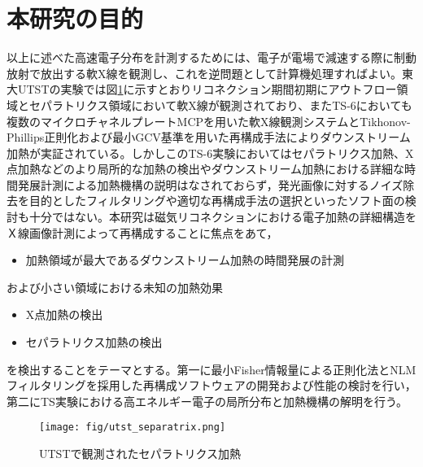 \section{本研究の目的}
以上に述べた高速電子分布を計測するためには、電子が電場で減速する際に制動放射で放出する軟X線を観測し、これを逆問題として計算機処理すればよい。東大UTSTの実験では図\ref{fig:utst}に示すとおりリコネクション期間初期にアウトフロー領域とセパラトリクス領域において軟X線が観測されており\cite{utst}、またTS-6においても複数のマイクロチャネルプレートMCPを用いた軟X線観測システムとTikhonov-Phillips正則化および最小GCV基準\cite{iwama}を用いた再構成手法によりダウンストリーム加熱が実証されている。しかしこのTS-6実験においてはセパラトリクス加熱、X点加熱などのより局所的な加熱の検出やダウンストリーム加熱における詳細な時間発展計測による加熱機構の説明はなされておらず，発光画像に対するノイズ除去を目的としたフィルタリングや適切な再構成手法の選択といったソフト面の検討も十分ではない。本研究は磁気リコネクションにおける電子加熱の詳細構造をＸ線画像計測によって再構成することに焦点をあて，
\begin{itemize}
	\item [(1)]加熱領域が最大であるダウンストリーム加熱の時間発展の計測
\end{itemize}
および小さい領域における未知の加熱効果
\begin{itemize}
	\item [(2)]X点加熱の検出
	\item [(3)]セパラトリクス加熱の検出
\end{itemize}
を検出することをテーマとする。第一に最小Fisher情報量による正則化法とNLMフィルタリングを採用した再構成ソフトウェアの開発および性能の検討を行い，第二にTS実験における高エネルギー電子の局所分布と加熱機構の解明を行う。
\begin{figure}[H]
	 \centering
	 \texttt{[image: fig/utst\_separatrix.png]}
	 \caption{UTSTで観測されたセパラトリクス加熱\cite{utst}}
	 \label{fig:utst}
\end{figure}